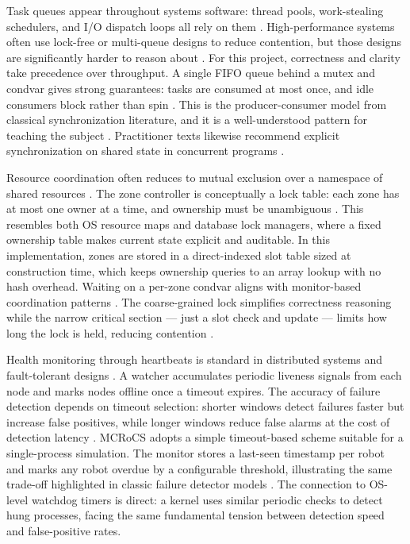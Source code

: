 \documentclass[11pt]{article}
\begin{document}
Task queues appear throughout systems software: thread pools, work-stealing schedulers, and I/O dispatch loops all rely on them \citep{arpaci2018,silberschatz2018}. High-performance systems often use lock-free or multi-queue designs to reduce contention, but those designs are significantly harder to reason about \citep{herlihy2020}. For this project, correctness and clarity take precedence over throughput. A single FIFO queue behind a mutex and condvar gives strong guarantees: tasks are consumed at most once, and idle consumers block rather than spin \citep{hoare1974}. This is the producer-consumer model from classical synchronization literature, and it is a well-understood pattern for teaching the subject \citep{downey2016}. Practitioner texts likewise recommend explicit synchronization on shared state in concurrent programs \citep{williams2019}.

Resource coordination often reduces to mutual exclusion over a namespace of shared resources \citep{silberschatz2018,tanenbaum2015}. The zone controller is conceptually a lock table: each zone has at most one owner at a time, and ownership must be unambiguous \citep{gray1993}. This resembles both OS resource maps and database lock managers, where a fixed ownership table makes current state explicit and auditable. In this implementation, zones are stored in a direct-indexed slot table sized at construction time, which keeps ownership queries to an array lookup with no hash overhead. Waiting on a per-zone condvar aligns with monitor-based coordination patterns \citep{hoare1974,lampson1980}. The coarse-grained lock simplifies correctness reasoning while the narrow critical section --- just a slot check and update --- limits how long the lock is held, reducing contention \citep{herlihy2020}.

Health monitoring through heartbeats is standard in distributed systems and fault-tolerant designs \citep{lynch1996,chandra1996}. A watcher accumulates periodic liveness signals from each node and marks nodes offline once a timeout expires. The accuracy of failure detection depends on timeout selection: shorter windows detect failures faster but increase false positives, while longer windows reduce false alarms at the cost of detection latency \citep{lynch1996}. MCRoCS adopts a simple timeout-based scheme suitable for a single-process simulation. The monitor stores a last-seen timestamp per robot and marks any robot overdue by a configurable threshold, illustrating the same trade-off highlighted in classic failure detector models \citep{chandra1996}. The connection to OS-level watchdog timers is direct: a kernel uses similar periodic checks to detect hung processes, facing the same fundamental tension between detection speed and false-positive rates.
\end{document}
